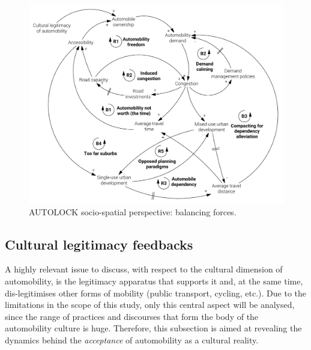 \begin{figure}[h]
\centering
\includegraphics[width=\textwidth]{figures/model/cropped/congestion-urban_3_final.pdf}
\caption{AUTOLOCK socio-spatial perspective: balancing forces.}
\label{f:results:cld_congestion_3}
\end{figure}

\subsection{Cultural legitimacy feedbacks}
\label{ss:results:cld_cultural-feedbacks}
A highly relevant issue to discuss, with respect to the cultural dimension of automobility, is the legitimacy apparatus that supports it and, at the same time, dis-legitimises other forms of mobility (public transport, cycling, etc.). Due to the limitations in the scope of this study, only this central aspect will be analysed, since the range of practices and discourses that form the body of the automobility culture is huge. Therefore, this subsection is aimed at revealing the dynamics behind the \emph{acceptance} of automobility as a cultural reality.

